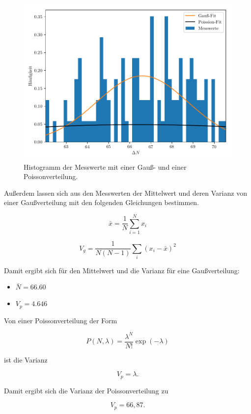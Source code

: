 \begin{figure}[H]
  \centering
  \includegraphics{plot5.pdf}
  \caption{Histogramm der Messwerte mit einer Gauß- und einer Poissonverteilung.}
  \label{abb:6}
\end{figure}

Außerdem lassen sich aus den Messwerten der Mittelwert und deren Varianz von einer
Gaußverteilung mit den folgenden Gleichungen bestimmen.

\begin{equation*}
    \bar{x} = \frac{1}{N} \sum_{i=1}^{N} x_i
\end{equation*}

\begin{equation*}
  V_g = \frac{1}{N(N-1)} \sum_{i}(x_i-\bar{x})^2
\end{equation*}

Damit ergibt sich für den Mittelwert und die Varianz für eine Gaußverteilung:

\begin{itemize}
  \item $\bar{N} = \num{66.60}$
  \item $V_p = \num{4.646}$
\end{itemize}

Von einer Poissonverteilung der Form

\begin{equation*}
  P(N, \lambda) = \frac{\lambda^N}{N!} \exp{(-\lambda)}
\end{equation*}

ist die Varianz

\begin{equation*}
  V_p = \lambda.
\end{equation*}

Damit ergibt sich die Varianz der Poissonverteilung zu

\begin{equation*}
  V_p = 66,87.
\end{equation*}

